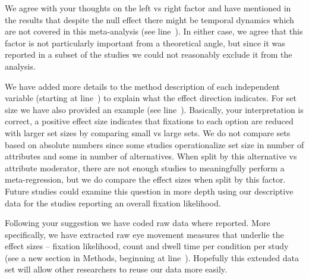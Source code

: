 We agree with your thoughts on the left vs right factor and have mentioned in the results that despite the null effect there might be temporal dynamics which are not covered in this meta-analysis (see line~). In either case, we agree that this factor is not particularly important from a theoretical angle, but since it was reported in a subset of the studies we could not reasonably exclude it from the analysis. 



We have added more details to the method description of each independent variable (starting at line~) to explain what the effect direction indicates. For set size we have also provided an example (see line~). Basically, your interpretation is correct, a positive effect size indicates that fixations to each option are reduced with larger set sizes by comparing small vs large sets. We do not compare sets based on absolute numbers since some studies operationalize set size in number of attributes and some in number of alternatives. When split by this alternative vs attribute moderator, there are not enough studies to meaningfully perform a meta-regression, but we do compare the effect sizes when split by this factor. Future studies could examine this question in more depth using our descriptive data for the studies reporting an overall fixation likelihood. 


Following your suggestion we have coded raw data where reported. More specifically, we have extracted raw eye movement measures that underlie the effect sizes -- fixation likelihood, count and dwell time per condition per study (see a new section in Methods, beginning at line~). Hopefully this extended data set will allow other researchers to reuse our data more easily.\\

